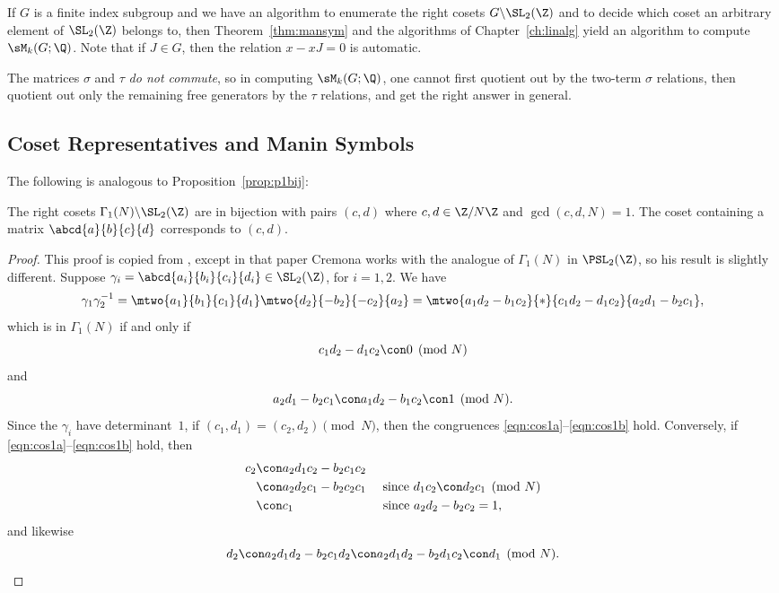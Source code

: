 If $G$ is a finite index subgroup and we have an algorithm to
enumerate the right cosets $G\backslash \SL_2(\Z)$ and to decide
which coset an arbitrary element of $\SL_2(\Z)$ belongs to, then
Theorem~\ref{thm:mansym} and the algorithms of Chapter~\ref{ch:linalg}
yield an algorithm to compute $\sM_k(G;\Q)$.  
Note that  if $J\in G$, then the relation $x-xJ=0$ is automatic.  

\begin{remark}
The matrices $\sigma$ and $\tau$ {\em do not commute},
so in computing $\sM_k(G;\Q)$, 
one cannot first quotient out by the two-term $\sigma$
relations, then quotient out only the remaining free generators
by the $\tau$ relations, and get the right answer in general.
\end{remark}


\subsection{Coset Representatives and Manin Symbols}

The following is analogous to Proposition~\ref{prop:p1bij}:

\begin{proposition}\label{prop:gamma1cosets}
The right cosets $\Gamma_1(N)\backslash \SL_2(\Z)$ are in bijection
with pairs $(c,d)$ where $c,d\in\Z/N\Z$ and $\gcd(c,d,N)=1$.
The coset containing
a matrix $\abcd{a}{b}{c}{d}$ corresponds to $(c,d)$.
\end{proposition}
\begin{proof}
This proof is copied from \cite[pg.~203]{cremona:gammaone},
except in that paper Cremona works with
the analogue of $\Gamma_1(N)$ in $\PSL_2(\Z)$, so
his result is slightly different.
Suppose $\gamma_i = \abcd{a_i}{b_i}{c_i}{d_i} \in \SL_2(\Z)$,
for $i=1,2$.
We have
$$
 \gamma_1 \gamma_2^{-1} = 
  \mtwo{a_1}{b_1}{c_1}{d_1}
  \mtwo{\hfill{}d_2}{-b_2}{-c_2}{\hfill{}a_2}
  =\mtwo{a_1 d_2 - b_1 c_2}{*}{c_1 d_2 - d_1 c_2}{a_2 d_1 - b_2 c_1},$$
which is in $\Gamma_1(N)$ if and only if 
\begin{equation}\label{eqn:cos1a}
  c_1 d_2 - d_1 c_2 \con 0 \pmod{N}
\end{equation}
and 
\begin{equation}\label{eqn:cos1b}
  a_2 d_1 - b_2 c_1 \con a_1 d_2 - b_1 c_2 \con 1\pmod{N}.
\end{equation}
Since the $\gamma_i$ have determinant~$1$, if $(c_1,d_1)=(c_2,d_2)\pmod{N}$,
then the congruences \eqref{eqn:cos1a}--\eqref{eqn:cos1b} hold.
Conversely, if \eqref{eqn:cos1a}--\eqref{eqn:cos1b} hold, then 
\begin{align*}
 c_2 &\con a_2 d_1 c_2 - b_2  c_1 c_2 \\
    &\con a_2 d_2 c_1 - b_2 c_2 c_1 \quad\text{ since }d_1 c_2 \con d_2 c_1 \pmod{N}\\
    &\con c_1 \qquad\qquad\qquad\quad\,\text{since }a_2 d_2 - b_2 c_2 = 1,
  \end{align*}
and likewise 
$$
d_2 \con a_2 d_1 d_2 - b_2 c_1 d_2
   \con a_2 d_1 d_2 - b_2 d_1 c_2
   \con d_1\pmod{N}.
$$
\end{proof}

